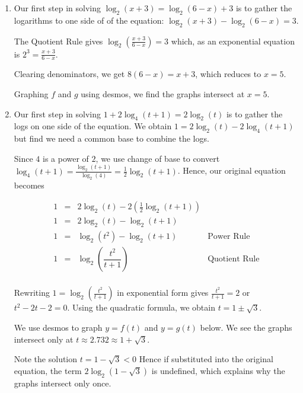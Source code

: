 \documentclass{ximera}
\begin{document}
\begin{example}
\begin{explanation}
\begin{enumerate}
\item Our first step in solving  $\log_{2}(x+3) = \log_{2}(6-x)+3$ is to gather the logarithms to one side of of the equation: $\log_{2}(x+3) - \log_{2}(6-x) = 3$.

The  Quotient Rule gives $\log_{2}\left(\frac{x+3}{6-x}\right) = 3$ which, as an exponential equation is $2^{3} = \frac{x+3}{6-x}$. 

Clearing denominators, we get $8(6-x) = x+3$, which reduces to  $x = 5$. 

Graphing $f$ and $g$ using desmos, we find the graphs intersect at $x=5$.

\begin{center}
\end{center}


\item Our first step in solving $1 + 2 \log_{4}(t+1) = 2 \log_{2}(t)$ is to gather the logs on one side of the equation.  We obtain  $1 = 2 \log_{2}(t) - 2 \log_{4}(t+1)$ but find we need a common base to combine the logs.

Since $4$ is a power of $2$, we use change of base to convert  $\log_{4}(t+1) = \frac{\log_{2}(t+1)}{\log_{2}(4)} = \frac{1}{2} \log_{2}(t+1)$.  Hence, our original equation becomes  

\[ \begin{array}{rclr}

1 & = & 2 \log_{2}(t) - 2 \left(\frac{1}{2} \log_{2}(t+1)\right) & \\  
1 &= & 2\log_{2}(t) - \log_{2}(t+1) & \\  
1 & = & \log_{2}\left(t^2\right) - \log_{2}(t+1) & \text{Power Rule} \\  
1 & = & \log_{2}\left( \dfrac{t^{2}}{t+1}\right) & \text{Quotient Rule} \\ \end{array}\]

Rewriting $1 = \log_{2}\left( \frac{t^{2}}{t+1}\right)$ in exponential form gives  $ \frac{t^{2}}{t+1} = 2$ or $t^2 -2t-2 = 0$.  Using the quadratic formula, we obtain  $t = 1 \pm \sqrt{3}$.

We use desmos to graph $y = f(t)$ and $y = g(t)$ below. We see the graphs intersect only at $t \approx 2.732 \approx 1 + \sqrt{3}$.  


\begin{center}
\end{center}

Note the solution $t = 1 - \sqrt{3} < 0$ Hence if substituted into the original equation, the term $2 \log_{2}\left(1 - \sqrt{3}\right)$ is undefined, which explains why the graphs intersect only once.


\end{enumerate}
\end{explanation}
\end{example}
\end{document}
